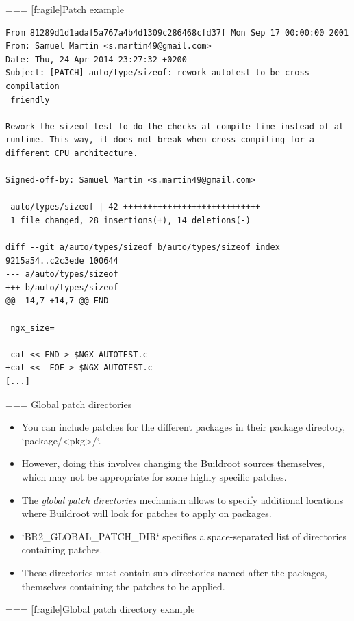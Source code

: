 === [fragile]{Patch example}

\begin{block}{}
{\tiny
\begin{verbatim}
From 81289d1d1adaf5a767a4b4d1309c286468cfd37f Mon Sep 17 00:00:00 2001
From: Samuel Martin <s.martin49@gmail.com>
Date: Thu, 24 Apr 2014 23:27:32 +0200
Subject: [PATCH] auto/type/sizeof: rework autotest to be cross-compilation
 friendly

Rework the sizeof test to do the checks at compile time instead of at runtime. This way, it does not break when cross-compiling for a different CPU architecture.

Signed-off-by: Samuel Martin <s.martin49@gmail.com>
---
 auto/types/sizeof | 42 ++++++++++++++++++++++++++++--------------
 1 file changed, 28 insertions(+), 14 deletions(-)

diff --git a/auto/types/sizeof b/auto/types/sizeof index 9215a54..c2c3ede 100644
--- a/auto/types/sizeof
+++ b/auto/types/sizeof
@@ -14,7 +14,7 @@ END
 
 ngx_size=
 
-cat << END > $NGX_AUTOTEST.c
+cat << _EOF > $NGX_AUTOTEST.c
[...]
\end{verbatim}}
\end{block}



=== {Global patch directories}
  \begin{itemize}
  \item You can include patches for the different packages in their
    package directory, `package/<pkg>/`.
  \item However, doing this involves changing the Buildroot sources
    themselves, which may not be appropriate for some highly specific
    patches.
  \item The {\em global patch directories} mechanism allows to specify
    additional locations where Buildroot will look for patches to
    apply on packages.
  \item `BR2_GLOBAL_PATCH_DIR` specifies a space-separated list
    of directories containing patches.
  \item These directories must contain sub-directories named after the
    packages, themselves containing the patches to be applied.
  \end{itemize}


=== [fragile]{Global patch directory example}

